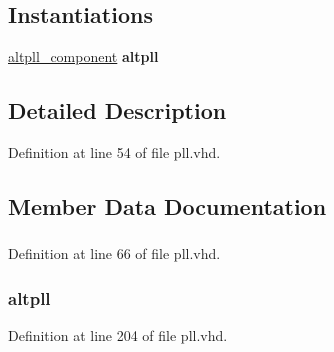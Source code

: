 \subsection*{Instantiations}
 \begin{DoxyCompactItemize}
\item 
\hyperlink{classpll_1_1_s_y_n_a70fc906d546df6812934a5430ac231a3}{altpll\+\_\+component}  {\bfseries altpll}   
\end{DoxyCompactItemize}


\subsection{Detailed Description}


Definition at line 54 of file pll.\+vhd.



\subsection{Member Data Documentation}
\hypertarget{classpll_1_1_s_y_n_ad45c11bbc2e898d68e19fa2eb5ba73d5}{}
\subsubsection[{altpll}]{ {\bfseries \textcolor{vhdlchar}{ }} \hspace{0.3cm}{\ttfamily [Component]}}\label{classpll_1_1_s_y_n_ad45c11bbc2e898d68e19fa2eb5ba73d5}


Definition at line 66 of file pll.\+vhd.

\hypertarget{classpll_1_1_s_y_n_a70fc906d546df6812934a5430ac231a3}{}
\subsubsection[{altpll\+\_\+component}]{ {\bfseries \textcolor{vhdlchar}{altpll}\textcolor{vhdlchar}{ }} \hspace{0.3cm}{\ttfamily [Instantiation]}}\label{classpll_1_1_s_y_n_a70fc906d546df6812934a5430ac231a3}


Definition at line 204 of file pll.\+vhd.

